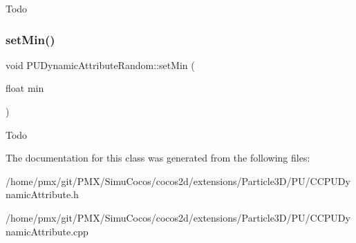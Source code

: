 Todo \mbox{\label{classPUDynamicAttributeRandom_a01a86b476cd6053523fccdedc7605519}} 
\subsubsection{\texorpdfstring{set\+Min()}{setMin()}\hspace{0.1cm}{\footnotesize\ttfamily [2/2]}}
{\footnotesize\ttfamily void P\+U\+Dynamic\+Attribute\+Random\+::set\+Min (\begin{DoxyParamCaption}\item[{float}]{min }\end{DoxyParamCaption})}

Todo 

The documentation for this class was generated from the following files\+:\begin{DoxyCompactItemize}
\item 
/home/pmx/git/\+P\+M\+X/\+Simu\+Cocos/cocos2d/extensions/\+Particle3\+D/\+P\+U/C\+C\+P\+U\+Dynamic\+Attribute.\+h\item 
/home/pmx/git/\+P\+M\+X/\+Simu\+Cocos/cocos2d/extensions/\+Particle3\+D/\+P\+U/C\+C\+P\+U\+Dynamic\+Attribute.\+cpp\end{DoxyCompactItemize}
